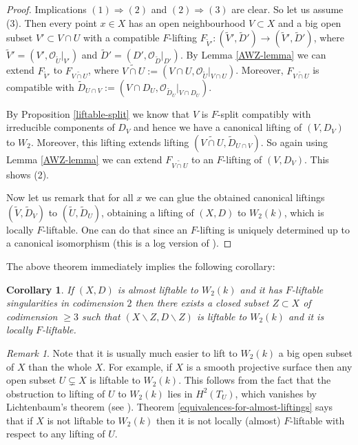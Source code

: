 \documentclass[12pt]{article}
\theoremstyle{plain}
\newtheorem{Corollary}[Thm]{\sc Corollary}
\theoremstyle{definition}
\theoremstyle{remark}
\newtheorem{Remark}[Thm]{Remark}
\newcommand{\cO}{{\mathcal O}}
\begin{document}
\begin{proof}
Implications $(1)\Rightarrow (2)$ and $(2)\Rightarrow (3)$ are clear. So let us assume (3). 
Then every point $x\in X$ has an open neighbourhood $V\subset X$ and a big open subset $V'\subset V\cap U$ with a compatible $F$-lifting $F_{\tilde V'}:(\tilde V', \tilde D') \to (\tilde V', \tilde D')$, where $\tilde V'=(V', \cO_{\tilde U}|_{V'})$ and  $\tilde D'=(D', \cO_{\tilde D}|_{D'})$.
By Lemma \ref{AWZ-lemma} we can extend $F_{\tilde V'}$ to  $F_{\widetilde{V\cap U}}$, where $\widetilde{V\cap U}:= (V\cap U, \cO_{\tilde U}|_{V\cap U})$. Moreover,  $F_{\widetilde{V\cap U}}$ is compatible with $\tilde D _{U\cap V}:= (V\cap D_U, \cO_{\tilde D_U}|_{V\cap D_U})$.

By Proposition \ref{liftable-split} we know that $V$ is $F$-split compatibly with irreducible components of $D_V$ and hence we have a canonical lifting of 
$(V,D_V)$ to $W_2$. Moreover, this lifting extends lifting $(\widetilde{V\cap U}, \tilde D _{U\cap V})$. So again using  Lemma \ref{AWZ-lemma} we can extend  $F_{\widetilde{V\cap U}}$ to an $F$-lifting of 
$(V, D_V)$. This shows (2). 

Now let us remark that for all $x$ we can glue the obtained canonical liftings $(\tilde V, \tilde D_V)$ to $(\tilde U, \tilde D_U)$, obtaining a lifting of  $(X,D)$ to $W_2(k)$, which is locally $F$-liftable.
One can do that since an $F$-lifting is uniquely determined up to a canonical isomorphism (this is a log version of \cite[Theorem 2.7]{AWZ2}). 
\end{proof}

The above theorem immediately implies the following corollary:

\begin{Corollary}
If $(X,D)$ is almost liftable to $W_2(k)$ and it has $F$-liftable singularities in codimension $2$
then there exists a closed subset $Z\subset X$ of codimension $\ge 3$ such that $(X\backslash Z, D\backslash Z)$ is liftable to $W_2(k)$ and it is locally $F$-liftable.
\end{Corollary}


\begin{Remark}
 Note that it is usually much easier to lift to $W_2(k)$ a big open subset of $X$ than the whole $X$.
	For example, if $X$ is a smooth projective surface then any open subset $U\subsetneq X$ is liftable to $W_2(k)$. This follows from the fact that the obstruction  to lifting of $U$ to $W_2(k)$ lies in $H^2 (T_U)$, which vanishes by Lichtenbaum's theorem (see \cite[Theorem 0G5F]{SP}). Theorem 
\ref{equivalences-for-almost-liftings} says that if $X$ is not liftable to $W_2(k)$ then it is not locally (almost) $F$-liftable with respect to any lifting of $U$.
\end{Remark}
\end{document}
